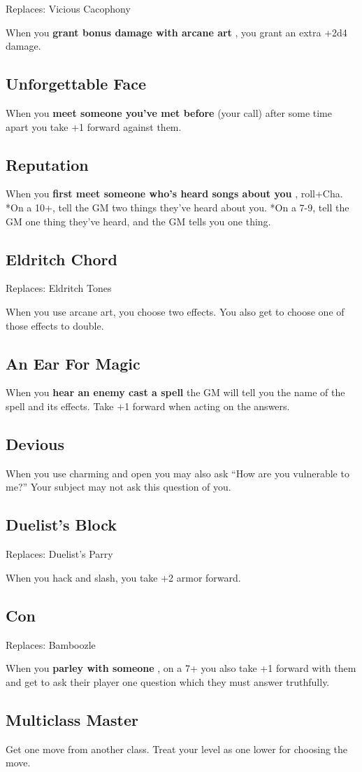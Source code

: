 Replaces: Vicious Cacophony

When you \textbf{grant bonus damage with arcane art}
, you grant an extra +2d4 damage.
\subsection{Unforgettable Face}

When you \textbf{meet someone you've met before}
(your call) after some time apart you take +1 forward against them.
\subsection{Reputation}

When you \textbf{first meet someone who's heard songs about you}
, roll+Cha. *On a 10+, tell the GM two things they've heard about you. *On a 7-9, tell the GM one thing they've heard, and the GM tells you one thing.
\subsection{Eldritch Chord}

Replaces: Eldritch Tones

When you use arcane art, you choose two effects. You also get to choose one of those effects to double.
\subsection{An Ear For Magic}

When you \textbf{hear an enemy cast a spell}
the GM will tell you the name of the spell and its effects. Take +1 forward when acting on the answers.
\subsection{Devious}

When you use charming and open you may also ask ``How are you vulnerable to me?'' Your subject may not ask this question of you.
\subsection{Duelist's Block}

Replaces: Duelist's Parry

When you hack and slash, you take +2 armor forward.
\subsection{Con}

Replaces: Bamboozle

When you \textbf{parley with someone}
, on a 7+ you also take +1 forward with them and get to ask their player one question which they must answer truthfully.
\subsection{Multiclass Master}

Get one move from another class. Treat your level as one lower for choosing the move.


